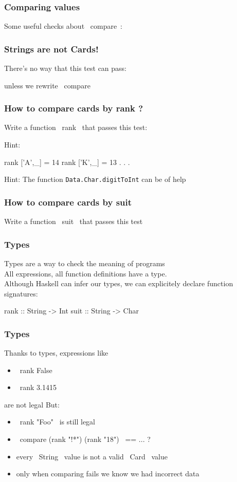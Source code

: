 \documentclass[11pt,xcolor={dvipsnames}]{beamer}
\newcommand{\vs}{\vspace{1em}}
\newcommand{\lstT}[1]{}
\begin{document}
\begin{frame}[fragile]
\frametitle{Comparing values}
Some useful checks about ~compare~:
\vs
\lstT{015}
\end{frame}
\begin{frame}[fragile]
\frametitle{Strings are not Cards!}
There's no way that this test can pass:
\vs
\lstT{016}
\vs
unless we rewrite ~compare~ 
\end{frame}
\begin{frame}[fragile]
\frametitle{How to compare cards by rank ?}
Write a function ~rank~ that passes this test:
\lstT{017}
Hint:
\begin{haskell}
rank ['A',_] = 14
rank ['K',_] = 13
    . . .
\end{haskell}
Hint:
The function \texttt{Data.Char.digitToInt} can be of help
\end{frame}
\begin{frame}[fragile]
\frametitle{How to compare cards by suit}
Write a function ~suit~ that passes this test
\vs
\lstT{018}
\end{frame}
\begin{frame}[fragile]
\frametitle{Types}
Types are a way to check the meaning of programs\\
All expressions, all function definitions have a type.\\
Although Haskell can infer our types, we can explicitely declare function signatures:
\vs
\begin{haskell}
rank :: String -> Int
suit :: String -> Char
\end{haskell}
\end{frame}
\begin{frame}[fragile]
\frametitle{Types}
Thanks to types, expressions like
\begin{itemize}
\item  ~rank False~ 
\item  ~rank 3.1415~ 
\end{itemize}
are not legal
\vs
But:
\begin{itemize}
\item  ~rank "Foo"~ is still legal
\item  ~compare (rank "!*") (rank "18")~ == ... ?
\item  every ~String~ value is not a valid ~Card~ value
\item  only when comparing fails we know we had incorrect data
\end{itemize}
\end{frame}
\end{document}

